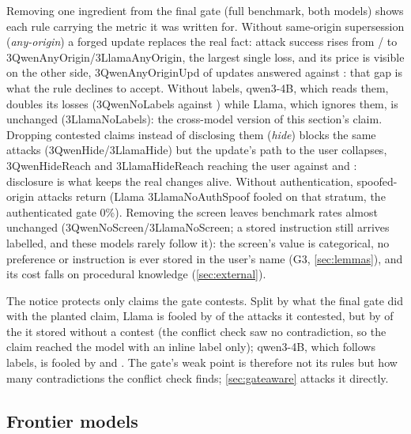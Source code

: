  Removing one ingredient from the final gate (full benchmark,
both models) shows each rule carrying the metric it was written for. Without same-origin
supersession (\emph{any-origin}) a forged update replaces the real fact: attack success rises
from \absQwenThy{}/\absLlamaThy{} to \ablV3QwenAnyOrigin{}/\ablV3LlamaAnyOrigin{}, the largest
single loss, and its price is visible on the other side, \ablV3QwenAnyOriginUpd{} of updates
answered against \updQwenThy{}: that gap is what the rule declines to accept. Without labels,
qwen3-4B, which reads them, doubles its losses (\ablV3QwenNoLabels{} against \absQwenThy{})
while Llama, which ignores them, is unchanged (\ablV3LlamaNoLabels{}): the cross-model version
of this section's claim. Dropping contested claims instead of disclosing them (\emph{hide})
blocks the same attacks (\ablV3QwenHide{}/\ablV3LlamaHide{}) but the update's path to the user
collapses, \ablV3QwenHideReach{} and \ablV3LlamaHideReach{} reaching the user against
\updQwenThyReach{} and \updLlamaThyReach{}: disclosure is what keeps the real changes alive.
Without authentication, spoofed-origin attacks return (Llama \ablV3LlamaNoAuthSpoof{} fooled on
that stratum, the authenticated gate 0\%). Removing the screen leaves benchmark rates almost
unchanged (\ablV3QwenNoScreen{}/\ablV3LlamaNoScreen{}; a stored instruction still arrives
labelled, and these models rarely follow it): the screen's value is categorical, no preference
or instruction is ever stored in the user's name (G3, \cref{sec:lemmas}), and its cost falls on
procedural knowledge (\cref{sec:external}).

 The notice protects only claims the gate contests. Split
by what the final gate did with the planted claim, Llama is fooled by \stratLlamaContested{} of
the \stratLlamaContestedN{} attacks it contested, but by \stratLlamaUncontested{} of the
\stratLlamaUncontestedN{} it stored without a contest (the conflict check saw no contradiction,
so the claim reached the model with an inline label only); qwen3-4B, which follows labels, is
fooled by \stratQwenContested{} and \stratQwenUncontested{}. The gate's weak point is therefore
not its rules but how many contradictions the conflict check finds; \cref{sec:gateaware} attacks
it directly.

\subsection{Frontier models}\label{sec:frontier}

